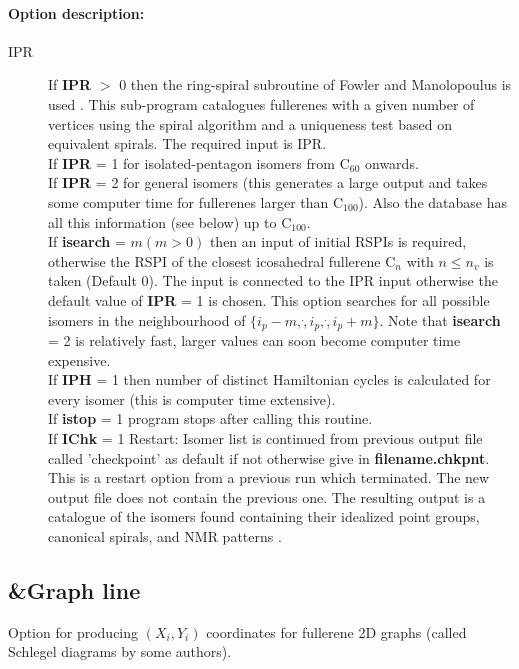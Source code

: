 \documentclass[article,a4paper,twoside]{memoir}
\newcommand{\C}[1]{\ensuremath{\mathrm{C}_{#1}}}
\newcommand{\paramname}[1]{{\color{green}\textbf{#1}}}
\begin{document}
\paragraph{Option description:}
\begin{description}
\item[IPR] 
If \paramname{IPR} $>$ 0 then the ring-spiral subroutine of Fowler and Manolopoulus is used \cite{Atlas}.
This sub-program catalogues fullerenes with a given number of vertices using the spiral algorithm and a uniqueness test
based on equivalent spirals. The required input is IPR.\\
If \paramname{IPR} = 1 for isolated-pentagon isomers from \C{60} onwards.\\
If \paramname{IPR} = 2 for general isomers (this generates a large output and takes some computer time for fullerenes larger than \C{100}).
Also the database has all this information (see below) up to \C{100}.\\
If \paramname{isearch} = $m (m > 0)$ then an input of initial RSPIs is required, otherwise the RSPI of the closest icosahedral fullerene \C{n} with $n \leq n_v$
is taken (Default 0). The input is connected to the IPR input otherwise the default value of  \paramname{IPR} = 1 is chosen. This option searches for all
possible isomers in the neighbourhood of $ \{ i_p - m, \dot ,i_p, \dot , i_p + m \} $. Note that \paramname{isearch} = 2 is relatively fast, larger values can soon
become computer time expensive.\\
If \paramname{IPH} = 1 then number of distinct Hamiltonian cycles is calculated for every isomer (this is computer time extensive).\\
If \paramname{istop} = 1 program stops after calling this routine.\\
If \paramname{IChk} = 1  Restart: Isomer list is continued from previous output file called 'checkpoint' as default if not otherwise give in \paramname{filename.chkpnt}.
This is a restart option from a previous run which terminated. The new output file does not contain the previous one.
The resulting output is a catalogue of the isomers found containing their idealized point groups, canonical spirals, and NMR patterns
\cite{Atlas}.
\end{description}


\subsection{\&Graph line}
 Option for producing $(X_i, Y_i)$ coordinates for fullerene 2D graphs (called Schlegel diagrams by some authors).
\end{document}
